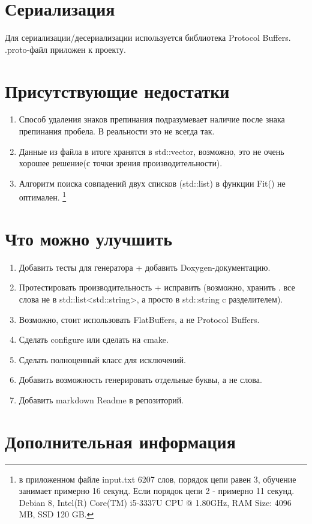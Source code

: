 \documentclass[a4paper]{article}
\begin{document}
\section{Сериализация}
Для сериализации/десериализации используется библиотека Protocol Buffers.\\
.proto-файл приложен к проекту.


\section{Присутствующие недостатки}
\begin{enumerate}
	\item Способ удаления знаков препинания подразумевает наличие после знака препинания пробела. В реальности это не всегда так.
	\item Данные из файла в итоге хранятся в std::vector, возможно, это не очень хорошее решение(с точки зрения производительности).
	\item Алгоритм поиска совпадений двух списков (std::list) в функции Fit() не оптимален.
	 \footnote {в приложенном файле input.txt 6207 слов, порядок цепи равен 3, обучение занимает примерно 16 секунд. Если порядок цепи 2 - примерно 11 секунд. Debian 8, Intel(R) Core(TM) i5-3337U CPU @ 1.80GHz, RAM Size: 4096 MB, SSD 120 GB.}
\end{enumerate}

\section{Что можно улучшить}
\begin{enumerate}
	\item Добавить тесты для генератора + добавить Doxygen-документацию.
	\item Протестировать производительность + исправить (возможно, хранить .
		все слова не в std::list<std::string>, а просто в std::string c разделителем).
	\item Возможно, стоит использовать FlatBuffers, а не Protocol Buffers.
	\item Сделать configure или сделать на cmake.
	\item Сделать полноценный класс для исключений.
	\item Добавить возможность генерировать отдельные буквы, а не слова.
	\item Добавить markdown Readme в репозиторий.

\end{enumerate}
\section{Дополнительная информация}
\end{document}
